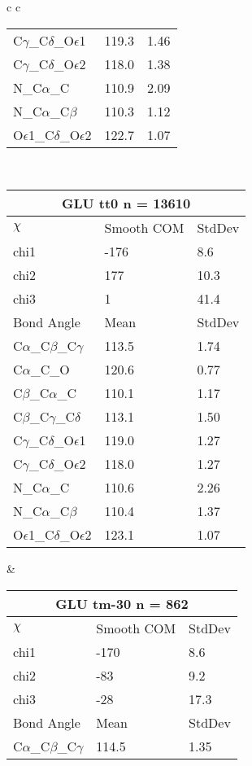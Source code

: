 \begin{longtable}{ c c }
\begin{tabular}{ l l l }
  C$\gamma$\_C$\delta$\_O$\epsilon$1 & 119.3 & 1.46\\
  C$\gamma$\_C$\delta$\_O$\epsilon$2 & 118.0 & 1.38\\
  N\_C$\alpha$\_C & 110.9 & 2.09\\
  N\_C$\alpha$\_C$\beta$ & 110.3 & 1.12\\
  O$\epsilon$1\_C$\delta$\_O$\epsilon$2 & 122.7 & 1.07\\
  \bottomrule
  \end{tabular}
  \\
  \begin{tabular}{ l l l }
  \toprule
  \multicolumn{3}{c}{GLU \textbf{tt0} n = 13610} \\ \toprule
  $\chi$       & Smooth COM & StdDev \\ \midrule
  chi1 & -176 & 8.6 \\ 
  chi2 & 177 & 10.3 \\ 
  chi3 & 1 & 41.4 \\ \midrule
  Bond Angle   & Mean     & StdDev \\ \midrule
  C$\alpha$\_C$\beta$\_C$\gamma$ & 113.5 & 1.74\\
  C$\alpha$\_C\_O & 120.6 & 0.77\\
  C$\beta$\_C$\alpha$\_C & 110.1 & 1.17\\
  C$\beta$\_C$\gamma$\_C$\delta$ & 113.1 & 1.50\\
  C$\gamma$\_C$\delta$\_O$\epsilon$1 & 119.0 & 1.27\\
  C$\gamma$\_C$\delta$\_O$\epsilon$2 & 118.0 & 1.27\\
  N\_C$\alpha$\_C & 110.6 & 2.26\\
  N\_C$\alpha$\_C$\beta$ & 110.4 & 1.37\\
  O$\epsilon$1\_C$\delta$\_O$\epsilon$2 & 123.1 & 1.07\\
  \bottomrule
  \end{tabular}
  &
  \begin{tabular}{ l l l }
  \toprule
  \multicolumn{3}{c}{GLU \textbf{tm-30} n = 862} \\ \toprule
  $\chi$       & Smooth COM & StdDev \\ \midrule
  chi1 & -170 & 8.6 \\ 
  chi2 & -83 & 9.2 \\ 
  chi3 & -28 & 17.3 \\ \midrule
  Bond Angle   & Mean     & StdDev \\ \midrule
  C$\alpha$\_C$\beta$\_C$\gamma$ & 114.5 & 1.35\\

\end{tabular}
\end{longtable}
